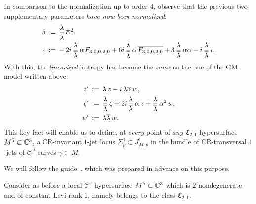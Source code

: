 \documentclass[12pt,twoside,leqno,openany]{amsart}
\begin{document}
In comparison to the normalization up to order $4$, observe
that the previous
two supplementary parameters {\em have now been normalized}:
\[
\aligned
\beta
&
\,:=\,
\frac{\lambda}{\overline{\lambda}}\,
\overline{\alpha}^2,
\\
\varepsilon
&
\,:=\,
-\,2i\,\frac{\lambda}{\overline{\lambda}}\,\alpha\,
F_{3,0,0,2,0}
+
6i\,\frac{\lambda}{\overline{\lambda}}\,\overline{\alpha}\,
\overline{F_{3,0,0,2,0}}
+
3\,\frac{\lambda}{\overline{\lambda}}\,\alpha\overline{\alpha}
-
i\,\frac{\lambda}{\overline{\lambda}}\,r.
\endaligned
\]
With this, the {\em linearized} isotropy has become the 
{\em same} as the one of the GM-model written above:
\leqnomode{}
\begin{align}
\label{linearized-GM-order-1}
z'
&
\,:=\,
\lambda\,z
-
i\,\lambda\overline{\alpha}\,w,
\notag
\\
\zeta'
&
\,:=\,
\frac{\lambda}{\overline{\lambda}}\,
\zeta
+
2i\,\frac{\lambda}{\overline{\lambda}}\,\overline{\alpha}\,
z
+
\frac{\lambda}{\overline{\lambda}}\,\overline{\alpha}^2\,
w,
\\
w'
&
\,:=\,
\lambda\overline{\lambda}\,
w.
\notag
\end{align}
This key fact will enable us to define,
at {\em every} point of {\em any}
$\mathfrak{C}_{2,1}$ hypersurface $M^5 \subset \mathbb{C}^3$,
a CR-invariant $1$-jet
locus $\Sigma_p^1 \subset J_{M,p}^1$ in the bundle
of CR-transversal $1$-jets of $\mathcal{C}^\omega$ 
curves $\gamma \subset M$.

We will follow the guide~{\cite{Merker-2020}}, 
which was prepared in advance on this purpose.

\label{point-translations-M5-C3}

Consider as before a local $\mathcal{C}^\omega$
hypersurface $M^5 \subset \mathbb{C}^3$ which is
$2$-nondegenerate and of constant Levi rank $1$,
namely belongs to the class $\mathfrak{C}_{2,1}$.
\end{document}
